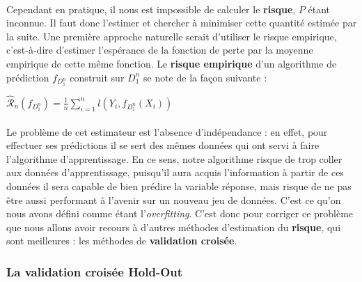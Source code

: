 \documentclass[14pt, openany]{article}
\begin{document}
\paragraph{}
Cependant en pratique, il nous est impossible de calculer le \textbf{risque}, $P$ étant inconnue. Il faut donc l'estimer et chercher à minimiser cette quantité estimée par la suite. Une première approche naturelle serait d'utiliser le risque empirique, c'est-à-dire d'estimer l'espérance de la fonction de perte par la moyenne empirique de cette même fonction. Le \textbf{risque empirique} d'un algorithme de prédiction $f_{D^{n}_{1}}$ construit sur $D^{n}_{1}$ se note de la façon suivante :
\begin{center}
$\widehat{\mathcal{R}}_n(f_{D^{n}_{1}}) = \frac{1}{n} \sum\limits_{i=1}^n l(Y_i,f_{D^{n}_{1}}(X_i))$
\end{center}

\paragraph{}
Le problème de cet estimateur est l'absence d'indépendance : en effet, pour effectuer ses prédictions il se sert des mêmes données qui ont servi à faire l'algorithme d'apprentissage. En ce sens, notre algorithme risque de trop \og coller \fg{} aux données d'apprentissage, puisqu'il aura acquis l'information à partir de ces données il sera capable de bien prédire la variable réponse, mais risque de ne pas être aussi performant à l'avenir sur un nouveau jeu de données. C'est ce qu'on nous avons défini comme étant l'\textit{overfitting}. C'est donc pour corriger ce problème que nous allons avoir recours à d'autres méthodes d'estimation du \textbf{risque}, qui sont meilleures : les méthodes de \textbf{validation croisée}.

\subsubsection{La validation croisée Hold-Out}
\end{document}
